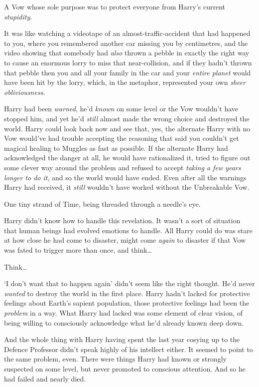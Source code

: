 A Vow whose sole purpose was to protect everyone from Harry’s current \emph{stupidity}.

It was like watching a videotape of an almost-traffic-accident that had happened to you, where you remembered another car missing you by centimetres, and the video showing that somebody had \emph{also} thrown a pebble in exactly the right way to cause an enormous lorry to miss that near-collision, and if they hadn’t thrown that pebble then you and all your family in the car and your \emph{entire planet} would have been hit by the lorry, which, in the metaphor, represented your own \emph{sheer obliviousness}.

Harry had been \emph{warned}, he’d \emph{known} on some level or the Vow wouldn’t have stopped him, and yet he’d \emph{still} almost made the wrong choice and destroyed the world. Harry could look back now and see that, yes, the alternate Harry with no Vow would’ve had trouble accepting the reasoning that said you couldn’t get magical healing to Muggles as fast as possible. If the alternate Harry had acknowledged the danger at all, he would have rationalized it, tried to figure out some clever way around the problem and refused to accept \emph{taking a few years longer to do it}, and so the world would have ended. Even after all the warnings Harry had received, it \emph{still} wouldn’t have worked without the Unbreakable Vow.

One tiny strand of Time, being threaded through a needle’s eye.

Harry didn’t know how to handle this revelation. It wasn’t a sort of situation that human beings had evolved emotions to handle. All Harry could do was stare at how close he had come to disaster, might come \emph{again} to disaster if that Vow was fated to trigger more than once, and think…

Think…

‘I don’t want that to happen again’ didn’t seem like the right thought. He’d never \emph{wanted} to destroy the world in the first place. Harry hadn’t lacked for protective feelings about Earth’s sapient population, those protective feelings had been the \emph{problem} in a way. What Harry had lacked was some element of clear vision, of being willing to consciously acknowledge what he’d already known deep down.

And the whole thing with Harry having spent the last year cosying up to the Defence Professor didn’t speak highly of his intellect either. It seemed to point to the same problem, even. There were things Harry had known or strongly suspected on some level, but never promoted to conscious attention. And so he had failed and nearly died.

